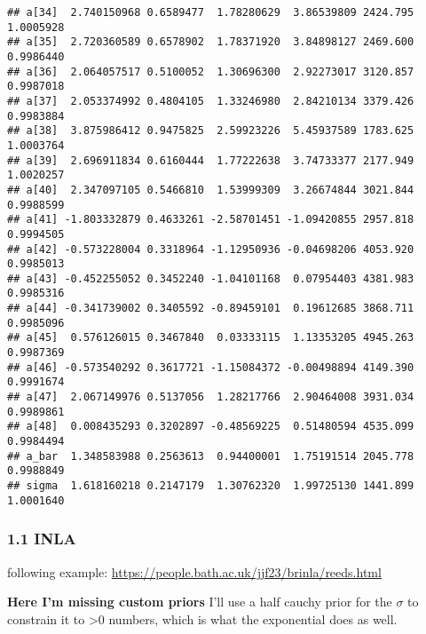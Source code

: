 \documentclass[
]{article}
\begin{document}
\begin{verbatim}
## a[34]  2.740150968 0.6589477  1.78280629  3.86539809 2424.795 1.0005928
## a[35]  2.720360589 0.6578902  1.78371920  3.84898127 2469.600 0.9986440
## a[36]  2.064057517 0.5100052  1.30696300  2.92273017 3120.857 0.9987018
## a[37]  2.053374992 0.4804105  1.33246980  2.84210134 3379.426 0.9983884
## a[38]  3.875986412 0.9475825  2.59923226  5.45937589 1783.625 1.0003764
## a[39]  2.696911834 0.6160444  1.77222638  3.74733377 2177.949 1.0020257
## a[40]  2.347097105 0.5466810  1.53999309  3.26674844 3021.844 0.9988599
## a[41] -1.803332879 0.4633261 -2.58701451 -1.09420855 2957.818 0.9994505
## a[42] -0.573228004 0.3318964 -1.12950936 -0.04698206 4053.920 0.9985013
## a[43] -0.452255052 0.3452240 -1.04101168  0.07954403 4381.983 0.9985316
## a[44] -0.341739002 0.3405592 -0.89459101  0.19612685 3868.711 0.9985096
## a[45]  0.576126015 0.3467840  0.03333115  1.13353205 4945.263 0.9987369
## a[46] -0.573540292 0.3617721 -1.15084372 -0.00498894 4149.390 0.9991674
## a[47]  2.067149976 0.5137056  1.28217766  2.90464008 3931.034 0.9989861
## a[48]  0.008435293 0.3202897 -0.48569225  0.51480594 4535.099 0.9984494
## a_bar  1.348583988 0.2563613  0.94400001  1.75191514 2045.778 0.9988849
## sigma  1.618160218 0.2147179  1.30762320  1.99725130 1441.899 1.0001640
\end{verbatim}

\hypertarget{inla}{%
\subsubsection{1.1 INLA}\label{inla}}

following example:
\url{https://people.bath.ac.uk/jjf23/brinla/reeds.html}

\textbf{Here I'm missing custom priors} I'll use a half cauchy prior for
the \(\sigma\) to constrain it to \textgreater0 numbers, which is what
the exponential does as well.
\end{document}
